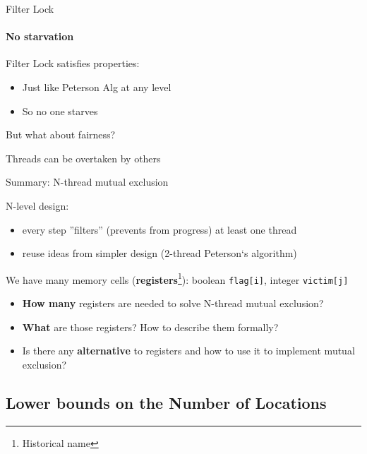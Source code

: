 \begin{frame}[t,fragile]{Filter Lock}
\framesubtitle{No starvation}

Filter Lock satisfies properties:
\begin{itemize}
  \item Just like Peterson Alg at any level
  \item So no one starves 
\end{itemize}

\pause
But what about fairness?

\pause
Threads can be overtaken by others 

\end{frame}


\begin{frame}[fragile]{Summary: N-thread mutual exclusion}

N-level design:
\begin{itemize}
  \item every step ''filters'' (prevents from progress) at least one thread
  \item reuse ideas from simpler design (2-thread Peterson`s algorithm)
\end{itemize}

\pause

We have many memory cells (\textbf{registers}\footnote<2->{Historical name}): boolean \texttt{flag[i]}, integer \texttt{victim[j]}
\begin{itemize}
  \pause
  \item \textbf{How many} registers are needed to solve N-thread mutual exclusion? 
  
  \pause
  \item \textbf{What} are those registers? How to describe them formally? 
  
  \pause
  \item Is there any \textbf{alternative} to registers and how to use it to implement mutual exclusion? 
  
\end{itemize}

\end{frame}

\subsection{Lower bounds on the Number of Locations}
\showTOCSub

